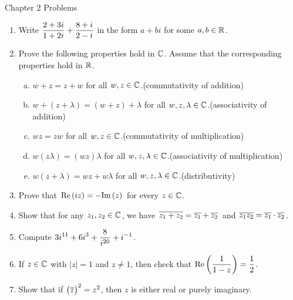 \documentclass[11pt,fleqn,dvipsnames,usenames]{article}
\renewcommand{\headrulewidth}{1pt}
\begin{document}
\fancyhead[L]{\course}
\fancyhead[R]{\term}
\renewcommand{\headrulewidth}{0.4pt}

{\huge Chapter 2 Problems}
\vsp

\begin{enumerate}
\item Write $\displaystyle{\frac{2 + 3i}{1 + 2i} + \frac{8+i}{2-i}}$ in the form $a+bi$ for some $a,b\in\mathbb{R}$.
\item Prove the following properties hold in $\mathbb{C}$.  Assume that the corresponding properties hold in $\mathbb{R}$.
\begin{enumerate}[(a)]
\item $w + z = z + w$ for all $w,z\in\mathbb{C}$.\hfill (commutativity of addition)
\item $w + (z + \lambda) = (w + z) + \lambda$ for all $w,z,\lambda\in\mathbb{C}$.\hfill (associativity of addition)
\item $wz = zw$ for all $w,z\in\mathbb{C}$.\hfill (commutativity of multiplication)
\item $w(z\lambda) = (wz)\lambda$ for all $w,z,\lambda\in\mathbb{C}$.\hfill (associativity of multiplication)
\item $w(z + \lambda) = wz + w\lambda$ for all $w,z,\lambda\in\mathbb{C}$.\hfill (distributivity)
\end{enumerate}
\item Prove that $\text{Re}\left(iz\right) = -\text{Im}\left(z\right)$ for every $z\in\mathbb{C}$.
\item Show that for any $z_{1},z_{2}\in\mathbb{C}$, we have $\overline{z_{1} + z_{2}} = \overline{z_{1}} + \overline{z_{2}}$ and $\overline{z_{1}z_{2}} = \overline{z_{1}}\cdot \overline{z_{2}}$.
\item Compute $\displaystyle{3i^{11} + 6i^{3} + \frac{8}{i^{20}} + i^{-1}}$.
\item If $z\in\mathbb{C}$ with $|z| = 1$ and $z\neq 1$, then check that $\text{Re}\left(\dfrac{1}{1-z}\right) = \dfrac{1}{2}$.
\item Show that if $\big(\overline{z}\big)^2 = z^2$, then $z$ is either real or purely imaginary.

\end{enumerate}
\end{document}
